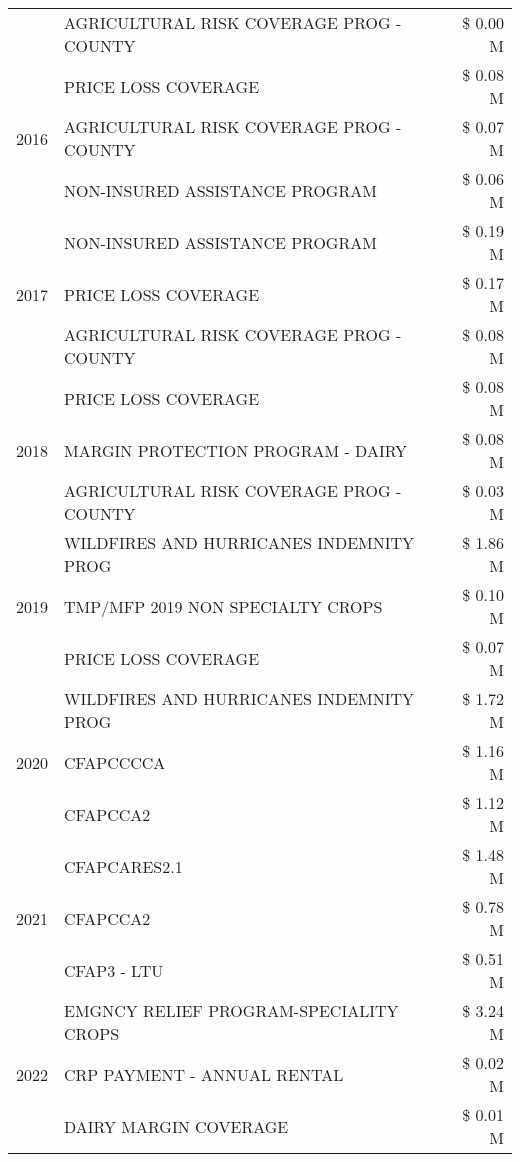 \begin{tabular}{llr}
 & AGRICULTURAL RISK COVERAGE PROG - COUNTY & \$ 0.00 M \\
\cline{1-3}
\multirow[t]{3}{*}{2016} & PRICE LOSS COVERAGE & \$ 0.08 M \\
 & AGRICULTURAL RISK COVERAGE PROG - COUNTY & \$ 0.07 M \\
 & NON-INSURED ASSISTANCE PROGRAM & \$ 0.06 M \\
\cline{1-3}
\multirow[t]{3}{*}{2017} & NON-INSURED ASSISTANCE PROGRAM & \$ 0.19 M \\
 & PRICE LOSS COVERAGE & \$ 0.17 M \\
 & AGRICULTURAL RISK COVERAGE PROG - COUNTY & \$ 0.08 M \\
\cline{1-3}
\multirow[t]{3}{*}{2018} & PRICE LOSS COVERAGE & \$ 0.08 M \\
 & MARGIN PROTECTION PROGRAM - DAIRY & \$ 0.08 M \\
 & AGRICULTURAL RISK COVERAGE PROG - COUNTY & \$ 0.03 M \\
\cline{1-3}
\multirow[t]{3}{*}{2019} & WILDFIRES AND HURRICANES INDEMNITY PROG & \$ 1.86 M \\
 & TMP/MFP 2019 NON SPECIALTY CROPS & \$ 0.10 M \\
 & PRICE LOSS COVERAGE & \$ 0.07 M \\
\cline{1-3}
\multirow[t]{3}{*}{2020} & WILDFIRES AND HURRICANES INDEMNITY PROG & \$ 1.72 M \\
 & CFAPCCCCA & \$ 1.16 M \\
 & CFAPCCA2 & \$ 1.12 M \\
\cline{1-3}
\multirow[t]{3}{*}{2021} & CFAPCARES2.1 & \$ 1.48 M \\
 & CFAPCCA2 & \$ 0.78 M \\
 & CFAP3 - LTU & \$ 0.51 M \\
\cline{1-3}
\multirow[t]{3}{*}{2022} & EMGNCY RELIEF PROGRAM-SPECIALITY CROPS & \$ 3.24 M \\
 & CRP PAYMENT - ANNUAL RENTAL & \$ 0.02 M \\
 & DAIRY MARGIN COVERAGE & \$ 0.01 M \\
\cline{1-3}
\bottomrule
\end{tabular}
